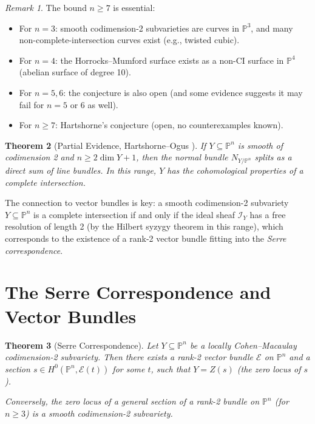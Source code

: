 \documentclass[12pt,a4paper]{amsart}
\newtheorem{theorem}{Theorem}[section]
\theoremstyle{definition}
\theoremstyle{remark}
\newtheorem{remark}[theorem]{Remark}
\newcommand{\PP}{\mathbb{P}}
\begin{document}
\begin{remark}
The bound $n \ge 7$ is essential:
\begin{itemize}
  \item For $n = 3$: smooth codimension-2 subvarieties are curves in $\PP^3$,
        and many non-complete-intersection curves exist (e.g., twisted cubic).
  \item For $n = 4$: the Horrocks--Mumford surface exists as a non-CI
        surface in $\PP^4$ (abelian surface of degree 10).
  \item For $n = 5, 6$: the conjecture is also open (and some evidence
        suggests it may fail for $n = 5$ or 6 as well).
  \item For $n \ge 7$: Hartshorne's conjecture (open, no counterexamples known).
\end{itemize}
\end{remark}

\begin{theorem}[Partial Evidence, Hartshorne--Ogus \cite{HartshorneOgus1974}]
If $Y \subseteq \PP^n$ is smooth of codimension 2 and $n \ge 2\dim Y + 1$,
then the normal bundle $N_{Y/\PP^n}$ splits as a direct sum of line bundles.
In this range, $Y$ has the cohomological properties of a complete intersection.
\end{theorem}

The connection to vector bundles is key: a smooth codimension-2 subvariety
$Y \subseteq \PP^n$ is a complete intersection if and only if the ideal
sheaf $\mathcal{I}_Y$ has a free resolution of length 2 (by the
Hilbert syzygy theorem in this range), which corresponds to the existence of
a rank-2 vector bundle fitting into the \emph{Serre correspondence}.

\section{The Serre Correspondence and Vector Bundles}

\begin{theorem}[Serre Correspondence]
Let $Y \subseteq \PP^n$ be a locally Cohen--Macaulay codimension-2 subvariety.
Then there exists a rank-2 vector bundle $\mathcal{E}$ on $\PP^n$ and a
section $s \in H^0(\PP^n, \mathcal{E}(t))$ for some $t$, such that
$Y = Z(s)$ (the zero locus of $s$).

Conversely, the zero locus of a general section of a rank-2 bundle on
$\PP^n$ (for $n \ge 3$) is a smooth codimension-2 subvariety.
\end{theorem}
\end{document}
